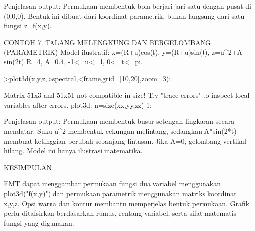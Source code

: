 \documentclass[a4paper,10pt]{article}
\begin{document}
\begin{eulernotebook}
\begin{eulercomment}
Penjelasan output:
Permukaan membentuk bola berjari-jari satu dengan pusat di
(0,0,0). Bentuk ini dibuat dari koordinat parametrik, bukan
langsung dari satu fungsi z=f(x,y).
\end{eulercomment}
\eulersubheading{}
\begin{eulercomment}
CONTOH 7. TALANG MELENGKUNG DAN BERGELOMBANG (PARAMETRIK)
Model ilustratif:
x=(R+u)cos(t), y=(R+u)sin(t), z=u\textasciicircum{}2+A sin(2t)
R=4, A=0.4, -1\textless{}=u\textless{}=1, 0\textless{}=t\textless{}=pi.
\end{eulercomment}
\eulersubheading{}
\begin{eulerprompt}
>plot3d(x,y,z,>spectral,<frame,grid=[10,20],zoom=3):
\end{eulerprompt}
\begin{euleroutput}
  Matrix 51x3 and 51x51 not compatible in size!
  Try "trace errors" to inspect local variables after errors.
  plot3d:
      n=size(xx,yy,zz)-1;
\end{euleroutput}
\begin{eulercomment}
Penjelasan output:
Permukaan membentuk busur setengah lingkaran secara mendatar.
Suku u\textasciicircum{}2 membentuk cekungan melintang, sedangkan A*sin(2*t)
membuat ketinggian berubah sepanjang lintasan. Jika A=0,
gelombang vertikal hilang. Model ini hanya ilustrasi matematika.
\end{eulercomment}
\eulersubheading{}
\begin{eulercomment}
KESIMPULAN
\end{eulercomment}
\eulersubheading{}
\begin{eulercomment}
EMT dapat menggambar permukaan fungsi dua variabel menggunakan
plot3d("f(x,y)") dan permukaan parametrik menggunakan matriks
koordinat x,y,z. Opsi warna dan kontur membantu memperjelas
bentuk permukaan. Grafik perlu ditafsirkan berdasarkan rumus,
rentang variabel, serta sifat matematis fungsi yang digunakan.
\end{eulercomment}
\end{eulernotebook}
\end{document}
